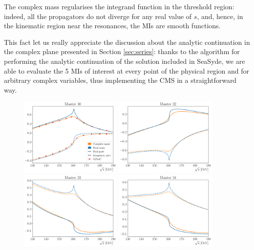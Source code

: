 \documentclass[final,1p,times]{elsarticle}
\begin{document}
The complex mass regularises the integrand function in the threshold region: indeed, all the propagators
\be
\ee
do not diverge for any real value of $s$, and, hence, in the kinematic region near the resonances, the MIs are smooth functions.

This fact let us really appreciate the discussion about the analytic continuation in the complex plane presented in Section \ref{sec:series}:
thanks to the algorithm for performing the analytic continuation of the solution included in {\sc SeaSyde}, we are able to evaluate the 5 MIs of interest at every point of the physical region and for arbitrary complex variables, thus implementing the CMS in a straightforward way.

\begin{figure}[ht!]
    \centering
    \includegraphics[width=0.45\textwidth]{master10_legend.pdf}
    \includegraphics[width=0.45\textwidth]{master32.pdf}
    \includegraphics[width=0.45\textwidth]{master33.pdf}
    \includegraphics[width=0.45\textwidth]{master34.pdf}

\end{figure}
\end{document}
